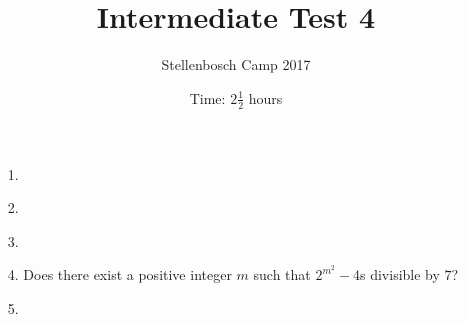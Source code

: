 \documentclass[12pt]{article}
\title{Intermediate Test 4}
\author{Stellenbosch Camp 2017}
\date{Time: $2\frac{1}{2}$ hours}
\begin{document}
 \maketitle

\begin{enumerate}

\item[1.] %


\item[2.] %


\item[3.] %


\item[4.] %
Does there exist a positive integer $m$ such that $2^{m^2} - 4$s divisible by $7$?


\item[5.] %
 


\end{enumerate}
\end{document}
